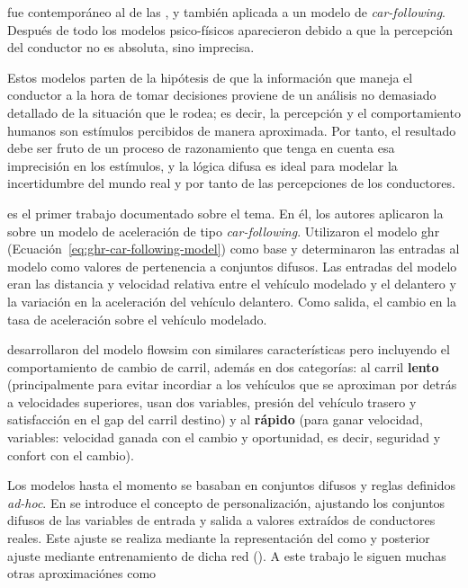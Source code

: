  fue contemporáneo al de las , y también aplicada a un modelo de \textit{\gls{car-following}}. Después de todo los modelos psico-físicos aparecieron debido a que la percepción del conductor no es absoluta, sino imprecisa.

Estos modelos parten de la hipótesis de que la información que maneja el conductor a la hora de tomar decisiones proviene de un análisis no demasiado detallado de la situación que le rodea; es decir, la percepción y el comportamiento humanos son estímulos percibidos de manera aproximada. Por tanto, el resultado debe ser fruto de un proceso de razonamiento que tenga en cuenta esa imprecisión en los estímulos, y la lógica difusa es ideal para modelar la incertidumbre del mundo real y por tanto de las percepciones de los conductores.

\cite{Kikuchi1992} es el primer trabajo documentado sobre el tema. En él, los autores aplicaron la  sobre un modelo de aceleración de tipo \textit{\gls{car-following}}. Utilizaron el modelo \gls{ghr} (Ecuación~\ref{eq:ghr-car-following-model}) como base y determinaron las entradas al modelo como valores de pertenencia a conjuntos difusos. Las entradas del modelo eran las distancia y velocidad relativa entre el vehículo modelado y el delantero y la variación en la aceleración del vehículo delantero. Como salida, el cambio en la tasa de aceleración sobre el vehículo modelado.

\cite{McDonald1997, Wu2003} desarrollaron del modelo \gls{flowsim} con similares características pero incluyendo el comportamiento de cambio de carril, además en dos categorías: al carril \textbf{lento} (principalmente para evitar incordiar a los vehículos que se aproximan por detrás a velocidades superiores, usan dos variables, presión del vehículo trasero y satisfacción en el gap del carril destino) y al \textbf{rápido} (para ganar velocidad, variables: velocidad ganada con el cambio y oportunidad, es decir, seguridad y confort con el cambio).

Los modelos hasta el momento se basaban en conjuntos difusos y reglas definidos \textit{ad-hoc}. En \cite{Chakroborty2003} se introduce el concepto de personalización, ajustando los conjuntos difusos de las variables de entrada y salida a valores extraídos de conductores reales. Este ajuste se realiza mediante la representación del  como  y posterior ajuste mediante entrenamiento de dicha red (\textit{}). A este trabajo le siguen muchas otras aproximaciónes \textit{} como \cite{mbede2004robust, Zheng2005}

